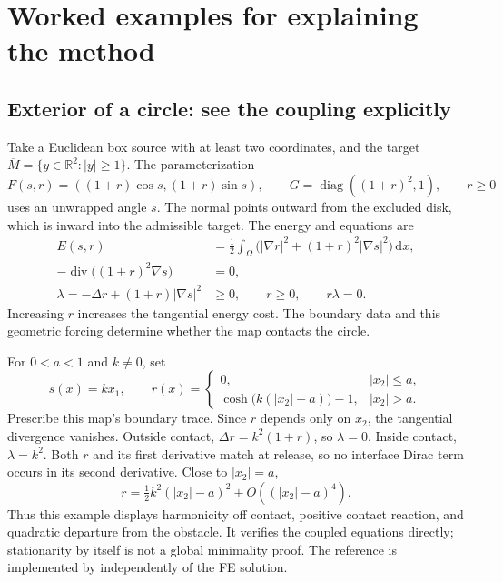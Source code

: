 \documentclass[11pt,a4paper]{article}
\newcommand{\R}{\mathbb R}
\newcommand{\dd}{\,\mathrm d}
\newcommand{\code}[1]{\texttt{\detokenize{#1}}}
\newcommand{\diag}{\operatorname{diag}}
\begin{document}
\section{Worked examples for explaining the method}
\label{sec:examples}

\subsection{Exterior of a circle: see the coupling explicitly}
Take a Euclidean box source with at least two coordinates, and the target
\(\overline M=\{y\in\R^2:|y|\geq1\}\). The parameterization
\begin{equation}
 F(s,r)=((1+r)\cos s,(1+r)\sin s),\qquad
 G=\diag((1+r)^2,1),\qquad r\geq0
\end{equation}
uses an unwrapped angle \(s\). The normal points outward from the excluded
disk, which is inward into the admissible target. The energy and equations
are
\begin{align}
 E(s,r)&=\tfrac12\int_\Omega
 \bigl(|\nabla r|^2+(1+r)^2|\nabla s|^2\bigr)\dd x,\\
 -\operatorname{div}\bigl((1+r)^2\nabla s\bigr)&=0,\\
 \lambda=-\Delta r+(1+r)|\nabla s|^2&\geq0,
 \qquad r\geq0,\qquad r\lambda=0.
 \label{eq:circle}
\end{align}
Increasing \(r\) increases the tangential energy cost. The boundary data
and this geometric forcing determine whether the map contacts the circle.

For \(0<a<1\) and \(k\ne0\), set
\begin{equation}
 s(x)=kx_1,\qquad
 r(x)=\begin{cases}
 0,&|x_2|\leq a,\\
 \cosh\bigl(k(|x_2|-a)\bigr)-1,&|x_2|>a.
 \end{cases}
 \label{eq:circle-reference}
\end{equation}
Prescribe this map's boundary trace. Since \(r\) depends only on \(x_2\),
the tangential divergence vanishes. Outside contact,
\(\Delta r=k^2(1+r)\), so \(\lambda=0\). Inside contact,
\(\lambda=k^2\). Both \(r\) and its first derivative match at release,
so no interface Dirac term occurs in its second derivative. Close to
\(|x_2|=a\),
\begin{equation}
 r=\tfrac12 k^2(|x_2|-a)^2+O((|x_2|-a)^4).
\end{equation}
Thus this example displays harmonicity off contact, positive contact
reaction, and quadratic departure from the obstacle. It verifies the
coupled equations directly; stationarity by itself is not a global
minimality proof. The reference is implemented by
\code{ExteriorCircleProfile} independently of the FE solution.
\end{document}
